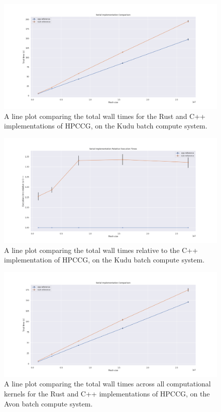 \begin{figure}[H]
    \centering
    \includegraphics[width=\textwidth]{images/5_performance/parallelism/1_serial_line.png}
    \caption{A line plot comparing the total wall times for the Rust and C++ implementations of HPCCG, on the Kudu batch compute system.}
    \label{fig:1_serial_line}
\end{figure}

\begin{figure}[H]
    \centering
    \includegraphics[width=\textwidth]{images/5_performance/parallelism/2_serial_line_relative.png}
    \caption{A line plot comparing the total wall times relative to the C++ implementation of HPCCG, on the Kudu batch compute system.}
    \label{fig:2_serial_line_relative}
\end{figure}

\begin{figure}[H]
    \centering
    \includegraphics[width=\textwidth]{images/5_performance/parallelism/1_serial_line_avon.png}
    \caption{A line plot comparing the total wall times across all computational kernels for the Rust and C++ implementations of HPCCG, on the Avon batch compute system.}
    \label{fig:1_serial_line_avon}
\end{figure}

